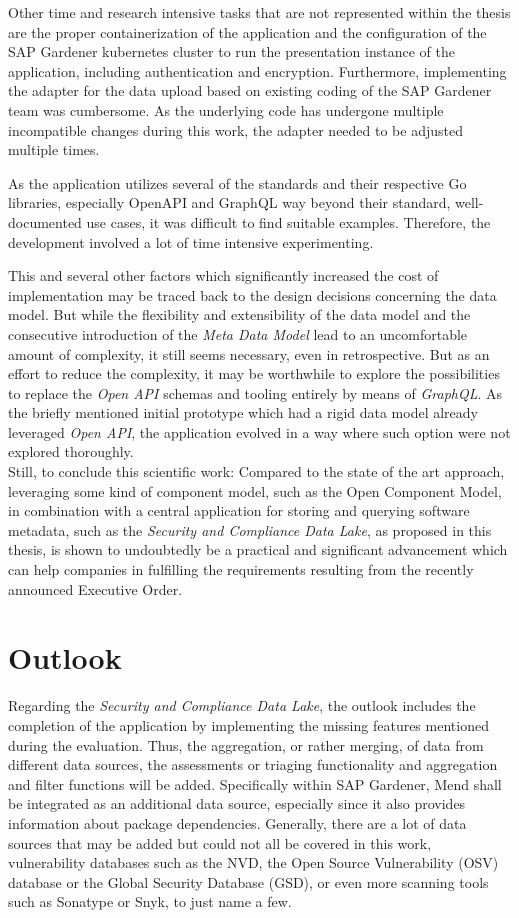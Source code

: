 Other time and research intensive tasks that are not represented within the thesis are the proper containerization of the application and the configuration of the SAP Gardener kubernetes cluster to run the presentation instance of the application, including authentication and encryption. Furthermore, implementing the adapter for the data upload based on existing coding of the SAP Gardener team was cumbersome. As the underlying code has undergone multiple incompatible changes during this work, the adapter needed to be adjusted multiple times.\par
As the application utilizes several of the standards and their respective Go libraries, especially OpenAPI and GraphQL way beyond their standard, well-documented use cases, it was difficult to find suitable examples. Therefore, the development involved a lot of time intensive experimenting.\par
This and several other factors which significantly increased the cost of implementation may be traced back to the design decisions concerning the data model.  But while the flexibility and extensibility of the data model and the consecutive introduction of the \emph{Meta Data Model} lead to an uncomfortable amount of complexity, it still seems necessary, even in retrospective. But as an effort to reduce the complexity, it may be worthwhile to explore the possibilities to replace the \emph{Open API} schemas and tooling entirely by means of \emph{GraphQL}. As the briefly mentioned initial prototype which had a rigid data model already leveraged \emph{Open API}, the application evolved in a way where such option were not explored thoroughly.\\

Still, to conclude this scientific work: Compared to the state of the art approach, leveraging some kind of component model, such as the Open Component Model, in combination with a central application for storing and querying software metadata, such as the \emph{Security and Compliance Data Lake}, as proposed in this thesis, is shown to undoubtedly be a practical and significant advancement which can help companies in fulfilling the requirements resulting from the recently announced Executive Order. 

\section{Outlook}
Regarding the \emph{Security and Compliance Data Lake}, the outlook includes the completion of the application by implementing the missing features mentioned during the evaluation. Thus, the aggregation, or rather merging, of data from different data sources, the assessments or triaging functionality and aggregation and filter functions will be added. Specifically within SAP Gardener, Mend shall be integrated as an additional data source, especially since it also provides information about package dependencies. Generally, there are a lot of data sources that may be added but could not all be covered in this work, vulnerability databases such as the NVD, the Open Source Vulnerability (OSV) database or the Global Security Database (GSD), or even more scanning tools such as Sonatype or Snyk, to just name a few.\\
 
